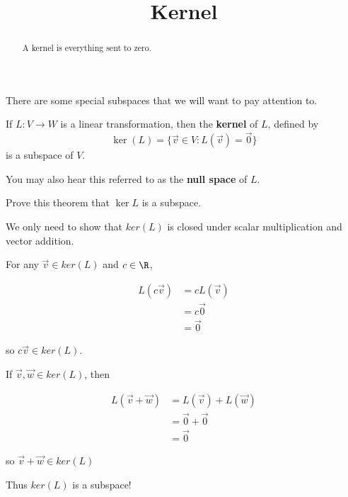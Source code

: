 \documentclass{ximera}
\title{Kernel}
\begin{document}
\begin{abstract}
	A kernel is everything sent to zero.
\end{abstract}\maketitle

There are some special subspaces that we will want to pay attention to.

\begin{theorem}
  If $L:V \to W$ is a linear transformation, then the \textbf{kernel} of $L$, defined by $$\ker(L) = \{\vec{v} \in V:L(\vec{v}) = \vec{0}\}$$ is a subspace of $V$.
\end{theorem}

You may also hear this referred to as the \textbf{null space} of $L$.

Prove this theorem that $\ker L$ is a subspace.

\begin{free-response}
We only need to show that $ker(L)$ is closed under scalar multiplication and vector addition.

For any $\vec{v} \in ker(L)$ and $c \in \R$,

\begin{align*}
	L(c\vec{v}) &=cL(\vec{v})\\
		&=c\vec{0}\\
		&=\vec{0}
\end{align*}

so $c\vec{v} \in ker(L)$.

If $\vec{v},\vec{w} \in ker(L)$, then

\begin{align*}
	L(\vec{v}+\vec{w}) &= L(\vec{v})+L(\vec{w})\\
	&= \vec{0}+\vec{0}\\
	&=\vec{0}
\end{align*}

so $\vec{v}+\vec{w} \in ker(L)$

Thus $ker(L)$ is a subspace!

\end{free-response}
\end{document}
